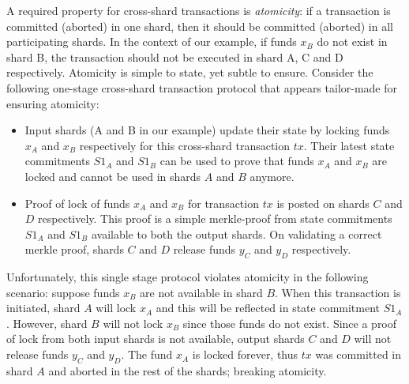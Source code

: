 \documentclass{article}
\begin{document}
A required property for cross-shard transactions is {\em atomicity}: %
if a transaction is committed (aborted) in one shard, then it should be  committed (aborted) in all participating shards. In the context of our example, if funds $x_B$ do not exist in shard B, the transaction should not be executed in shard A, C and D respectively. Atomicity is simple to state,  yet subtle to ensure. Consider the following  one-stage cross-shard transaction protocol that appears tailor-made for ensuring atomicity: 
\begin{itemize}
    \item Input shards (A and B in our example) update their state by locking funds $x_A$ and $x_B$ respectively for this cross-shard transaction $tx$. Their latest state commitments $S1_A$ and $S1_B$ can be used to prove that funds $x_A$ and $x_B$ are locked and cannot be used in shards $A$ and $B$ anymore. 
    \item Proof of lock of funds $x_A$ and $x_B$ for transaction $tx$ is posted on shards $C$ and $D$ respectively. This proof is a simple merkle-proof from state commitments $S1_A$ and $S1_B$  available to both the output shards. On validating a correct merkle proof, shards $C$ and $D$ release funds $y_C$ and $y_D$ respectively.
\end{itemize}
Unfortunately, this single stage protocol violates atomicity in the following scenario: suppose funds $x_B$ are not available in shard $B$. When this transaction is initiated, shard $A$ will lock $x_A$ and this will be reflected in state commitment $S1_A$.  However, shard $B$ will not lock $x_B$ since those funds do not exist. Since a proof of lock from both input shards is not available, output shards $C$ and $D$ will not release funds $y_C$ and $y_D$. The fund $x_A$ is locked forever, thus $tx$ was committed in shard $A$ and aborted in the rest of the shards; breaking atomicity. 
\end{document}
